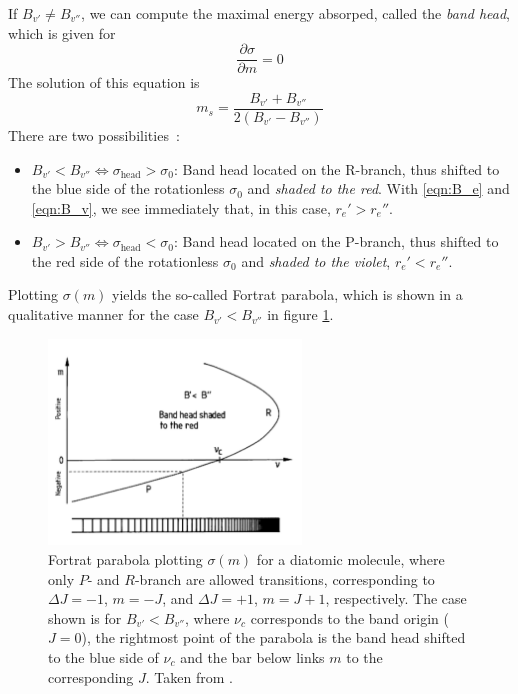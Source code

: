 If $B_{v'} \neq B_{v''}$, we can compute the maximal energy absorped, 
called the \emph{band head}, which is given for 
\begin{equation}
    \frac{\partial \sigma}{\partial m} = 0 
\end{equation}
The solution of this equation is
\begin{equation}
    m_s = \frac{B_{v'} + B_{v''}}{2(B_{v'} - B_{v''})}
\end{equation}
There are two possibilities~\cite{Demtroeder1}:
\begin{itemize}
        \item $B_{v'} < B_{v''} \Leftrightarrow \sigma_\mathrm{head} > \sigma_0$:
            Band head located on the R-branch, thus shifted 
            to the blue side of the rotationless $\sigma_0$ 
            and \emph{shaded to the red}. With \eqref{eqn:B_e} and \eqref{eqn:B_v}, 
            we see immediately that, in this case, $r_e' > r_e''$.
        \item $B_{v'} > B_{v''} \Leftrightarrow \sigma_\mathrm{head} < \sigma_0$:
            Band head located on the P-branch, thus shifted 
            to the red side of the rotationless $\sigma_0$ 
            and \emph{shaded to the violet}, 
            $r_e' < r_e''$.
\end{itemize}
Plotting $\sigma(m)$ yields the so-called Fortrat parabola, which is shown in a 
qualitative manner for the case $B_{v'} < B_{v''}$ in figure \ref{fig:fortrat}.
\begin{figure}
    \centering
    \includegraphics[width=0.6\textwidth]{pics/fortrat.pdf}
    \caption{Fortrat parabola plotting $\sigma(m)$ for a diatomic molecule, where 
    only $P$- and $R$-branch are allowed transitions, corresponding to 
    $\Delta J = -1$, $m = -J$, and $\Delta J = +1$, $m = J + 1$, respectively. 
    The case shown is for $B_{v'} < B_{v''}$, where $\nu_c$ corresponds to the 
    band origin ($J = 0$), the rightmost point of the parabola is the 
    band head shifted to the blue side of $\nu_c$ and the bar below links $m$ to 
    the corresponding $J$. Taken from \cite{Demtroeder1}.
    }
    \label{fig:fortrat}
\end{figure}



